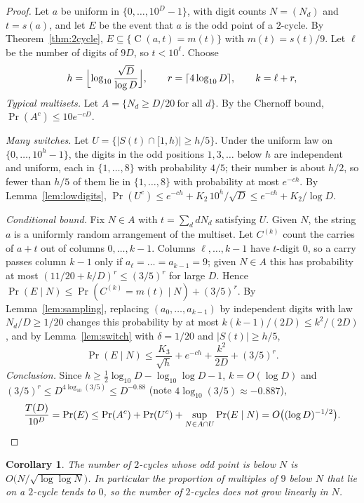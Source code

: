\documentclass[11pt]{article}
\newtheorem{corollary}[theorem]{Corollary}
\theoremstyle{definition}
\theoremstyle{remark}
\newcommand{\C}{\operatorname{C}}
\begin{document}
\begin{proof}
Let $a$ be uniform in $\{0,\dots,10^D-1\}$, with digit counts $N=(N_d)$ and
$t=s(a)$, and let $E$ be the event that $a$ is the odd point of a
$2$-cycle. By Theorem~\ref{thm:2cycle}, $E\subseteq\{\C(a,t)=m(t)\}$ with
$m(t)=s(t)/9$. Let $\ell$ be the number of digits of $9D$, so $t<10^\ell$.
Choose
\[
  h=\Bigl\lfloor\log_{10}\frac{\sqrt D}{\log D}\Bigr\rfloor,\qquad
  r=\lceil 4\log_{10}D\rceil,\qquad k=\ell+r ,
\]
\emph{Typical multisets.} Let $A=\{N_d\ge D/20\ \text{for all } d\}$. By the
Chernoff bound, $\Pr(A^c)\le10e^{-cD}$.

\emph{Many switches.} Let $U=\{|S(t)\cap[1,h)|\ge h/5\}$. Under the uniform
law on $\{0,\dots,10^h-1\}$, the digits in the odd positions $1,3,\dots$ below
$h$ are independent and uniform, each in $\{1,\dots,8\}$ with probability
$4/5$; their number is about $h/2$, so fewer than $h/5$ of them lie in
$\{1,\dots,8\}$ with probability at most $e^{-ch}$. By
Lemma~\ref{lem:lowdigits},
$\Pr(U^c)\le e^{-ch}+K_2\,10^h/\sqrt D\le e^{-ch}+K_2/\log D$.

\emph{Conditional bound.} Fix $N\in A$ with $t=\sum_d dN_d$ satisfying $U$.
Given $N$, the string $a$ is a uniformly random arrangement of the multiset.
Let $C^{(k)}$ count the carries of $a+t$ out of columns $0,\dots,k-1$.
Columns $\ell,\dots,k-1$ have $t$-digit $0$, so a carry passes column $k-1$
only if $a_\ell=\dots=a_{k-1}=9$; given $N\in A$ this has probability at most
$(11/20+k/D)^r\le(3/5)^r$ for large $D$. Hence
$\Pr(E\mid N)\le\Pr(C^{(k)}=m(t)\mid N)+(3/5)^r$. By
Lemma~\ref{lem:sampling}, replacing $(a_0,\dots,a_{k-1})$ by independent
digits with law $N_d/D\ge1/20$ changes this probability by at most
$k(k-1)/(2D)\le k^2/(2D)$, and by Lemma~\ref{lem:switch} with $\delta=1/20$ and
$|S(t)|\ge h/5$,
\[
  \Pr(E\mid N)\le \frac{K_3}{\sqrt h}+e^{-ch}+\frac{k^2}{2D}+(3/5)^r .
\]
\emph{Conclusion.} Since $h\ge\frac12\log_{10}D-\log_{10}\log D-1$, $k=O(\log D)$
and $(3/5)^r\le D^{4\log_{10}(3/5)}\le D^{-0.88}$ (note
$4\log_{10}(3/5)\approx-0.887$),
\[
  \frac{T(D)}{10^D}=\Pr(E)\le\Pr(A^c)+\Pr(U^c)+\sup_{N\in A\cap U}\Pr(E\mid N)
  =O\bigl((\log D)^{-1/2}\bigr). \qedhere
\]
\end{proof}

\begin{corollary}\label{cor:zero}
The number of $2$-cycles whose odd point is below $N$ is
$O\bigl(N/\sqrt{\log\log N}\bigr)$. In particular the proportion of multiples
of $9$ below $N$ that lie on a $2$-cycle tends to $0$, so the number of
$2$-cycles does not grow linearly in $N$.
\end{corollary}
\end{document}
